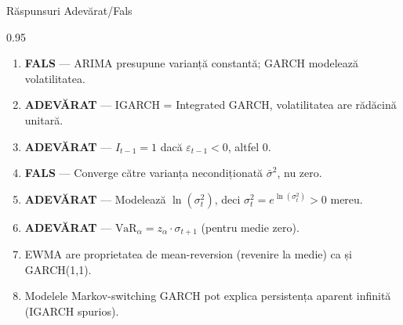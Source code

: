 \documentclass[9pt, aspectratio=169, t]{beamer}
\begin{document}
\begin{frame}{Răspunsuri Adevărat/Fals}
    \begin{cminipage}{0.95\textwidth}
    \begin{enumerate}\setlength{\itemsep}{0pt}
        \item \textbf{FALS} --- ARIMA presupune varianță constantă; GARCH modelează volatilitatea.

        \vspace{0.2cm}

        \item \textbf{ADEVĂRAT} --- IGARCH = Integrated GARCH, volatilitatea are rădăcină unitară.

        \vspace{0.2cm}

        \item \textbf{ADEVĂRAT} --- $I_{t-1} = 1$ dacă $\varepsilon_{t-1} < 0$, altfel 0.

        \vspace{0.2cm}

        \item \textbf{FALS} --- Converge către varianța necondiționată $\bar{\sigma}^2$, nu zero.

        \vspace{0.2cm}

        \item \textbf{ADEVĂRAT} --- Modelează $\ln(\sigma_t^2)$, deci $\sigma_t^2 = e^{\ln(\sigma_t^2)} > 0$ mereu.

        \vspace{0.2cm}

        \item \textbf{ADEVĂRAT} --- $\text{VaR}_\alpha = z_\alpha \cdot \sigma_{t+1}$ (pentru medie zero).

        \vspace{0.2cm}

        \item EWMA are proprietatea de mean-reversion (revenire la medie) ca și GARCH(1,1).

        \vspace{0.2cm}

        \item Modelele Markov-switching GARCH pot explica persistența aparent infinită (IGARCH spurios).
    \end{enumerate}
    \end{cminipage}
\end{frame}
\end{document}
